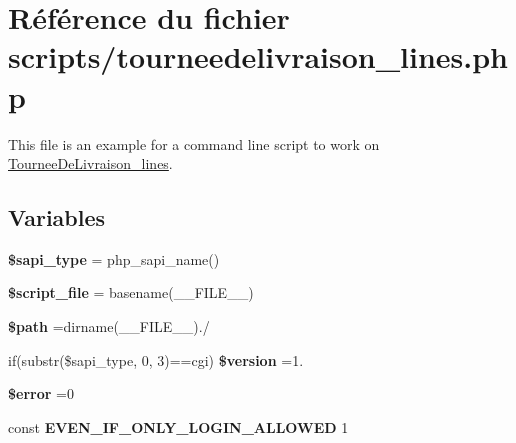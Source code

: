 \hypertarget{tourneedelivraison__lines_8php}{}\section{Référence du fichier scripts/tourneedelivraison\+\_\+lines.php}
\label{tourneedelivraison__lines_8php}


This file is an example for a command line script to work on \hyperlink{classTourneeDeLivraison__lines}{Tournee\+De\+Livraison\+\_\+lines}.  


\subsection*{Variables}
\begin{DoxyCompactItemize}
\item 
\mbox{\label{tourneedelivraison__lines_8php_a86e02f00a36d0fcbf274de973b2640d0}} 
{\bfseries \$sapi\+\_\+type} = php\+\_\+sapi\+\_\+name()
\item 
\mbox{\label{tourneedelivraison__lines_8php_a97b9f047572d6c50f29fbea522f6c17e}} 
{\bfseries \$script\+\_\+file} = basename(\+\_\+\+\_\+\+F\+I\+L\+E\+\_\+\+\_\+)
\item 
\mbox{\label{tourneedelivraison__lines_8php_a0a4baf0b22973c07685c3981f0d17fc4}} 
{\bfseries \$path} =dirname(\+\_\+\+\_\+\+F\+I\+L\+E\+\_\+\+\_\+).\textquotesingle{}/\textquotesingle{}
\item 
\mbox{\label{tourneedelivraison__lines_8php_a0a351317886caa2358df1658880c0c78}} 
if(substr(\$sapi\+\_\+type, 0, 3)==\textquotesingle{}cgi\textquotesingle{}) {\bfseries \$version} =\textquotesingle{}1.\textquotesingle{}
\item 
\mbox{\label{tourneedelivraison__lines_8php_aeba2ab722cedda53dbb7ec1a59f45550}} 
{\bfseries \$error} =0
\item 
\mbox{\label{tourneedelivraison__lines_8php_a2b87986264c1ca3cddb96a106af7b37a}} 
const {\bfseries E\+V\+E\+N\+\_\+\+I\+F\+\_\+\+O\+N\+L\+Y\+\_\+\+L\+O\+G\+I\+N\+\_\+\+A\+L\+L\+O\+W\+ED} 1

\end{DoxyCompactItemize}
